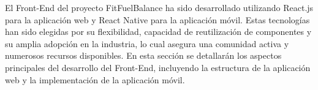 El Front-End del proyecto FitFuelBalance ha sido desarrollado utilizando React.js para la aplicación web y React Native para la aplicación móvil. Estas tecnologías han sido elegidas por su flexibilidad, capacidad de reutilización de componentes y su amplia adopción en la industria, lo cual asegura una comunidad activa y numerosos recursos disponibles. En esta sección se detallarán los aspectos principales del desarrollo del Front-End, incluyendo la estructura de la aplicación web y la implementación de la aplicación móvil.